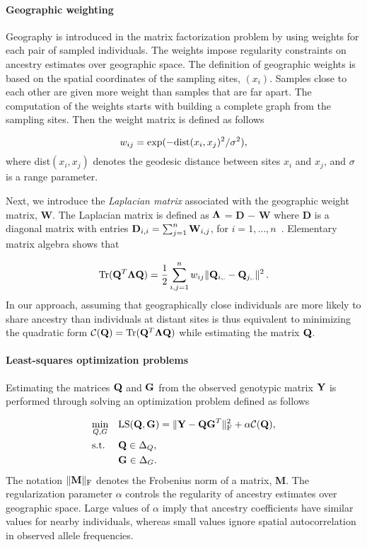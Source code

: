  \paragraph{Geographic weighting} Geography is introduced in the matrix factorization problem by using weights for each pair of sampled individuals. The weights impose regularity constraints on ancestry estimates over geographic space. The definition of geographic weights is based on the spatial coordinates of the sampling sites, $(x_i)$. Samples close to each other are given more weight than samples that are far apart. The computation of the weights starts with building a complete graph from the sampling sites. Then the weight matrix is defined as follows

$$
w_{ij} = \exp( - {\rm dist}( x_i, x_j )^2/ \sigma^2),
$$
\noindent where dist$( x_i, x_j )$ denotes the geodesic distance between sites $x_i$ and  $x_j$, and $\sigma$ is a range parameter. 


Next, we introduce the {\it Laplacian matrix} associated with the geographic weight matrix, {\bf W}. The Laplacian matrix is defined as ${\bf \Lambda}$ = {\bf D} $-$ {\bf W}  where  {\bf D} is a diagonal matrix with entries
${\bf D}_{i,i} = \sum_{j = 1}^n  {\bf W}_{i,j}$,  for  $i = 1, \dots, n$~\citep{Belkin2003}. Elementary matrix algebra shows that~\citep{DengCai2011}

$$
 {\rm Tr} ({\bf Q}^T {\bf \Lambda} {\bf Q})  = \frac12 \sum_{i,j = 1}^n  w_{ij}  \|   {\bf Q}_{i,.}  - {\bf Q}_{j,.} \|^2 \, .
$$
In our approach, assuming that geographically close individuals are more likely to share ancestry than individuals at distant sites is thus equivalent to minimizing the quadratic form ${\cal C}({\bf Q}) ={\rm Tr} ({\bf Q}^T {\bf \Lambda} {\bf Q})$ while estimating the matrix ${\bf Q}$. 

\paragraph{Least-squares optimization problems} Estimating the matrices ${\bf Q}$ and ${\bf G }$ from the observed genotypic matrix ${\bf Y}$ is performed through solving an optimization problem defined as follows~\citep{Caye2016}

\begin{equation}
\begin{aligned}
& \underset{Q, G}{\text{min}}
& & {\rm LS}({\bf Q}, {\bf G}) =   \|  {\bf Y} - {\bf QG}^T \|^2_{\rm F} +  \alpha {\cal C}({\bf Q}) , \\
& \text{s.t.} & &  {\bf Q} \in \Delta_Q , \\
& & &  {\bf G} \in \Delta_G . \\
\end{aligned}
\label{eq:LS}
\end{equation}
\noindent The notation $\| {\bf M} \|_{\rm F}$ denotes the Frobenius norm of a
matrix, {\bf M}. The regularization parameter $\alpha $ controls the regularity
of ancestry estimates over geographic space. Large values of $\alpha $ imply
that ancestry coefficients have similar values for nearby individuals, whereas
small values ignore spatial autocorrelation in observed allele frequencies.

